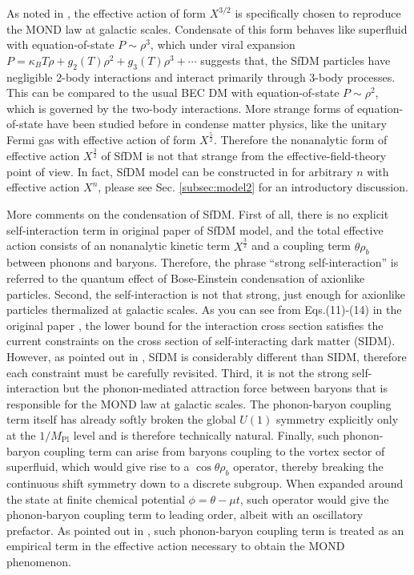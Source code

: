 \documentclass[aps,prd,twocolumn,10pt,groupedaddress]{revtex4-1}
\begin{document}
As noted in \cite{Berezhiani:2015bqa}, the effective action of form $X^{3/2}$ is specifically chosen to reproduce the MOND law at galactic scales. Condensate of this form behaves like superfluid with equation-of-state $P\sim\rho^3$, which under viral expansion $P=\kappa_BT\rho+g_2(T)\rho^2+g_3(T)\rho^3+\cdots$ suggests that, the SfDM particles have negligible 2-body interactions and interact primarily through 3-body processes. This can be compared to the usual BEC DM with equation-of-state $P\sim\rho^2$, which is governed by the two-body interactions. More strange forms of equation-of-state have been studied before in condense matter physics, like the unitary Fermi gas with effective action of form $X^\frac52$. Therefore the nonanalytic form of effective action $X^\frac32$ of SfDM is not that strange from the effective-field-theory point of view. In fact, SfDM model can be constructed in \cite{Khoury:2016ehj} for arbitrary $n$ with effective action $X^n$, please see Sec. \ref{subsec:model2} for an introductory discussion.

More comments on the condensation of SfDM. First of all, there is no explicit self-interaction term in original paper \cite{Berezhiani:2015bqa} of SfDM model, and the total effective action consists of an nonanalytic kinetic term $X^\frac32$ and a coupling term $\theta\rho_b$ between phonons and baryons. Therefore, the phrase ``strong self-interaction'' is referred to the quantum effect of Bose-Einstein condensation of axionlike particles. Second, the self-interaction is not that strong, just enough for axionlike particles thermalized at galactic scales. As you can see from Eqs.(11)-(14) in the original paper \cite{Berezhiani:2015bqa}, the lower bound for the interaction cross section satisfies the current constraints on the cross section of self-interacting dark matter (SIDM). However, as pointed out in \cite{Berezhiani:2015bqa}, SfDM is considerably different than SIDM, therefore each constraint must be carefully revisited. Third, it is not the strong self-interaction but the phonon-mediated attraction force between baryons that is responsible for the MOND law at galactic scales. The phonon-baryon coupling term itself has already softly broken the global $U(1)$ symmetry explicitly only at the $1/M_\mathrm{Pl}$ level and is therefore technically natural. Finally, such phonon-baryon coupling term can arise from baryons coupling to the vortex sector of superfluid, which would give rise to a $\cos\theta\rho_b$ operator, thereby breaking the continuous shift symmetry down to a discrete subgroup. When expanded around the state at finite chemical potential $\phi=\theta-\mu t$, such operator would give the phonon-baryon coupling term to leading order, albeit with an oscillatory prefactor. As pointed out in \cite{Berezhiani:2015bqa}, such phonon-baryon coupling term is treated as an empirical term in the effective action necessary to obtain the MOND phenomenon.
\end{document}
